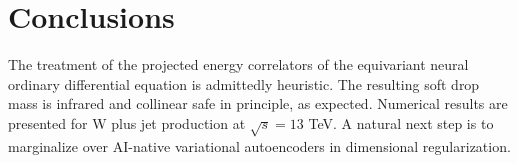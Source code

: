 \section{Conclusions}\label{sec:conclusions}

The treatment of the projected energy correlators of the equivariant
neural ordinary differential equation is admittedly heuristic. The
resulting soft drop mass is infrared and collinear safe in principle, as
expected. Numerical results are presented for W plus jet production at
$\sqrt{s} = 13$ TeV. A natural next step is to marginalize over
AI-native variational autoencoders in dimensional regularization.

